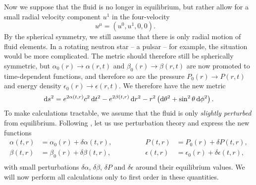 Now we suppose that the fluid is no longer in equilibrium, but rather allow for a small radial velocity component $u^1$ in the four-velocity
\begin{equation}
	u^\mu = (u^0, u^1, 0, 0) .
	\quad
\label{eq:nstars:velocity_unstable}
\end{equation}
By the spherical symmetry, we still assume that there is only radial motion of fluid elements.
In a rotating neutron star -- a pulsar -- for example, the situation would be more complicated.
The metric should therefore still be spherically symmetric, but $\alpha_0(r) \rightarrow \alpha(r,t)$ and $\beta_0(r) \rightarrow \beta(r,t)$ are now promoted to time-dependent functions, and therefore so are the pressure $P_0(r) \rightarrow P(r,t)$ and energy density $\epsilon_0(r) \rightarrow \epsilon(r,t)$.
We therefore have the new metric
\begin{equation}
	\mathop{}\!\mathrm{d} s^2 = e^{2 \alpha(t, r)} c^2 \mathop{}\!\mathrm{d} t^2 - e^{2 \beta(t, r)} \mathop{}\!\mathrm{d} r^2 - r^2 \left( \mathop{}\!\mathrm{d} \theta^2 + \sin^2 \theta \mathop{}\!\mathrm{d} \phi^2 \right) .
\label{eq:nstars:metric_unstable}
\end{equation}
To make calculations tractable, we assume that the fluid is only \emph{slightly perturbed} from equilibrium.
Following \cite{ref:chandrasekhar_stability}, let us use perturbation theory and express the new functions
\begin{equation}
\begin{aligned}
	\alpha   (t, r) &= \alpha_0  (r) + \delta \alpha  (t, r), & \qquad \qquad
	P        (t, r) &= P_0       (r) + \delta P       (t, r), \\
	\beta    (t, r) &= \beta_0   (r) + \delta \beta   (t, r), & \qquad \qquad
	\epsilon (t, r) &= \epsilon_0(r) + \delta \epsilon(t, r), \\
\end{aligned}
\label{eq:nstars:perturbation_expansion}
\end{equation}
with small perturbations $\delta \alpha$, $\delta \beta$, $\delta P$ and $\delta \epsilon$ around their equilibrium values.
We will now perform all calculations only to first order in these quantities.

